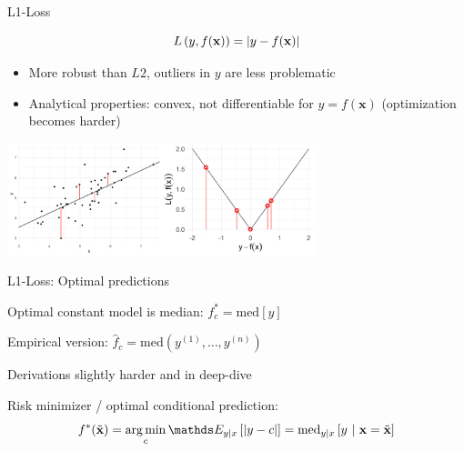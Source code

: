 \documentclass[11pt,compress,t,notes=noshow, xcolor=table]{beamer}
\begin{document}
\begin{vbframe}{L1-Loss}

$$
L\left(y, f(\mathbf{x})\right) = \left|y-f(\mathbf{x})\right|
$$

\begin{itemize}
\item More robust than $L2$, outliers in $y$ are less problematic
\item Analytical properties: convex, not differentiable for $y = f(\bm{x})$ (optimization becomes harder)
\end{itemize}

\vfill

\begin{center}  
\includegraphics[width = 9cm]{figure/loss_absolute_2.png} 
\end{center}


\end{vbframe}


\begin{vbframe}{L1-Loss: Optimal predictions}

\begin{itemizeL}

\item Optimal constant model is median: 
$f_{c}^{\ast} = \text{med} [y]$

\item Empirical version: $\hat{f}_c = \text{med}(y^{(1)}, \ldots, y^{(n)}) $  

\item Derivations slightly harder and in deep-dive

\item Risk minimizer / optimal conditional prediction:
  $$
    f^{\ast}(\xtil) = \argmin_c \E_{y|x}\left[|y - c|\right]= \text{med}_{y|x} \left[y ~|~ \xv = \xtil \right]
  $$
\end{itemizeL}

\end{vbframe}



\endlecture
\end{document}
